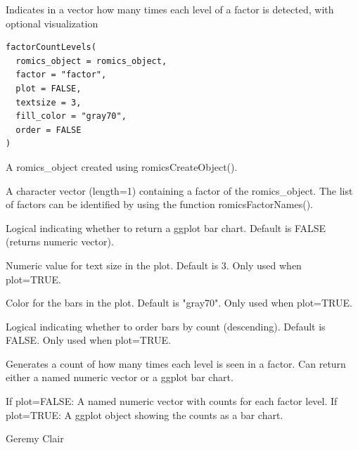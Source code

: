 \documentclass[a4paper]{book}
\begin{document}
%
\begin{Description}
Indicates in a vector how many times each level of a factor is detected, with optional visualization
\end{Description}
%
\begin{Usage}
\begin{verbatim}
factorCountLevels(
  romics_object = romics_object,
  factor = "factor",
  plot = FALSE,
  textsize = 3,
  fill_color = "gray70",
  order = FALSE
)
\end{verbatim}
\end{Usage}
%
\begin{Arguments}
\begin{ldescription}
\item[\code{romics\_object}] A romics\_object created using romicsCreateObject().

\item[\code{factor}] A character vector (length=1) containing a factor of the romics\_object. The list of factors can be identified by using the function romicsFactorNames().

\item[\code{plot}] Logical indicating whether to return a ggplot bar chart. Default is FALSE (returns numeric vector).

\item[\code{textsize}] Numeric value for text size in the plot. Default is 3. Only used when plot=TRUE.

\item[\code{fill\_color}] Color for the bars in the plot. Default is "gray70". Only used when plot=TRUE.

\item[\code{order}] Logical indicating whether to order bars by count (descending). Default is FALSE. Only used when plot=TRUE.
\end{ldescription}
\end{Arguments}
%
\begin{Details}
Generates a count of how many times each level is seen in a factor. Can return either a named numeric vector or a ggplot bar chart.
\end{Details}
%
\begin{Value}
If plot=FALSE: A named numeric vector with counts for each factor level. If plot=TRUE: A ggplot object showing the counts as a bar chart.
\end{Value}
%
\begin{Author}
Geremy Clair
\end{Author}
\end{document}
